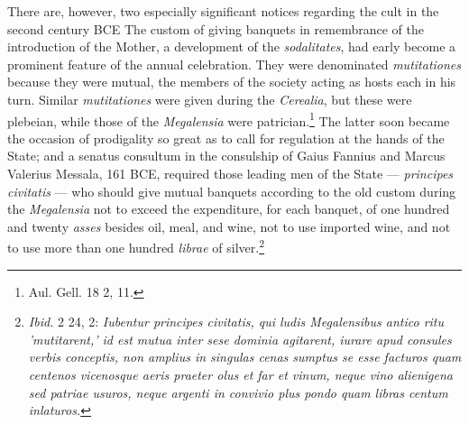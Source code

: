 \documentclass[a4paper, 11pt, oneside, polutonikogreek, french]{article}
\begin{document}
There are, however, two especially significant notices regarding the cult in the second century \textsc{BCE} The custom of giving banquets in remembrance of the introduction of the Mother, a development of the \emph{sodalitates}, had early become a prominent feature of the annual celebration. They were denominated \emph{mutitationes} because they were mutual, the members of the society acting as hosts each in his turn. Similar \emph{mutitationes} were given during the \emph{Cerealia}, but these were plebeian, while those of the \emph{Megalensia} were patrician.\footnote{Aul. Gell. 18 2, 11.} The latter soon became the occasion of prodigality so great as to call for regulation at the hands of the State; and a senatus consultum in the consulship of Gaius Fannius and Marcus Valerius Messala, 161 \textsc{BCE}, required those leading men of the State --- \emph{principes civitatis} --- who should give mutual banquets according to the old custom during the \emph{Megalensia} not to exceed the expenditure, for each banquet, of one hundred and twenty \emph{asses} besides oil, meal, and wine, not to use imported wine, and not to use more than one hundred \emph{librae} of silver.\footnote{\emph{Ibid.} 2 24, 2: \emph{Iubentur principes civitatis, qui ludis Megalensibus antico ritu 'mutitarent,' id est mutua inter sese dominia agitarent, iurare apud consules verbis conceptis, non amplius in singulas cenas sumptus se esse facturos quam centenos vicenosque aeris praeter olus et far et vinum, neque vino alienigena sed patriae usuros, neque argenti in convivio plus pondo quam libras centum inlaturos.}}
\end{document}
